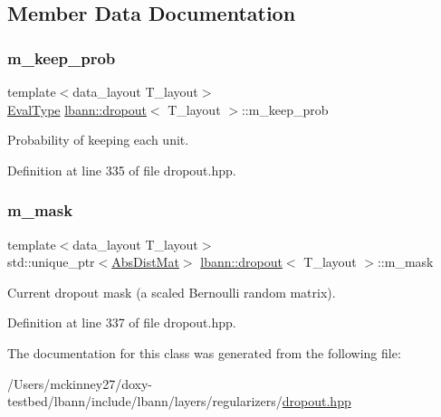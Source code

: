 \subsection{Member Data Documentation}
\mbox{\label{classlbann_1_1dropout_aa06cbee70f3426b589990889b8ac8872}} 
\subsubsection{\texorpdfstring{m\+\_\+keep\+\_\+prob}{m\_keep\_prob}}
{\footnotesize\ttfamily template$<$data\+\_\+layout T\+\_\+layout$>$ \\
\hyperlink{base_8hpp_a3266f5ac18504bbadea983c109566867}{Eval\+Type} \hyperlink{classlbann_1_1dropout}{lbann\+::dropout}$<$ T\+\_\+layout $>$\+::m\+\_\+keep\+\_\+prob\hspace{0.3cm}{\ttfamily [private]}}

Probability of keeping each unit. 

Definition at line 335 of file dropout.\+hpp.

\mbox{\label{classlbann_1_1dropout_ad7d359957d41adcb64e6e3a2d4ad278d}} 
\subsubsection{\texorpdfstring{m\+\_\+mask}{m\_mask}}
{\footnotesize\ttfamily template$<$data\+\_\+layout T\+\_\+layout$>$ \\
std\+::unique\+\_\+ptr$<$\hyperlink{base_8hpp_a9a697a504ae84010e7439ffec862b470}{Abs\+Dist\+Mat}$>$ \hyperlink{classlbann_1_1dropout}{lbann\+::dropout}$<$ T\+\_\+layout $>$\+::m\+\_\+mask\hspace{0.3cm}{\ttfamily [private]}}

Current dropout mask (a scaled Bernoulli random matrix). 

Definition at line 337 of file dropout.\+hpp.



The documentation for this class was generated from the following file\+:\begin{DoxyCompactItemize}
\item 
/\+Users/mckinney27/doxy-\/testbed/lbann/include/lbann/layers/regularizers/\hyperlink{dropout_8hpp}{dropout.\+hpp}\end{DoxyCompactItemize}
